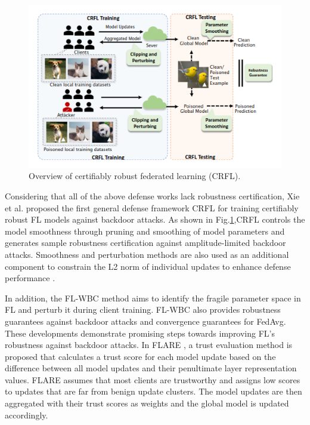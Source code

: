 \documentclass[conference]{IEEEtran}
\begin{document}
\begin{figure}[htbp]
    \centerline{\includegraphics[width=0.8\linewidth,height=0.6\linewidth]{picture/CRFL.png}}
    \caption{Overview of certifiably robust federated learning (CRFL).}
    \label{fig11}
\end{figure}


Considering that all of the above defense works lack robustness certification,
Xie et al. \cite{b86} proposed the first general defense framework CRFL for training certifiably robust FL models against backdoor attacks.
As shown in Fig.\ref{fig11},CRFL controls the model smoothness through pruning and smoothing of model parameters and generates sample robustness
certification against amplitude-limited backdoor attacks. Smoothness and perturbation methods are also used as an
additional component to constrain the L2 norm of individual updates to enhance defense performance \cite{b87}.

In addition, the FL-WBC \cite{b88} method aims to identify the fragile parameter space in FL and perturb it
during client training. FL-WBC also provides robustness guarantees against backdoor attacks and convergence guarantees for FedAvg.
These developments demonstrate promising steps towards improving FL's robustness against backdoor attacks. In FLARE \cite{b89}, a trust
evaluation method is proposed that calculates a trust score for each model update based on the difference between all model updates and
their penultimate layer representation values. FLARE assumes that most clients are trustworthy and assigns low scores
to updates that are far from benign update clusters. The model updates are then aggregated with their trust scores as
weights and the global model is updated accordingly.
\end{document}
